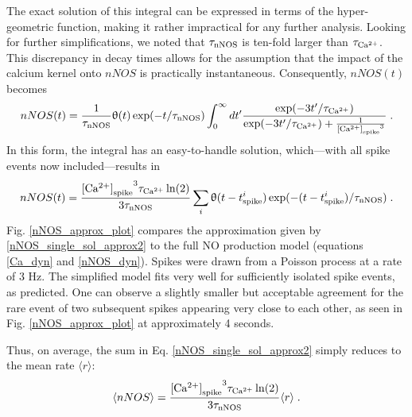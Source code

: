 \documentclass[10pt,letterpaper]{article}
\begin{document}
The exact solution of this integral can be expressed in terms of the hyper-geometric function, making it rather impractical for any further analysis. Looking for further simplifications, we noted that $\tau_{\rm nNOS}$ is ten-fold larger than $\tau_{\rm Ca^{2+}}$. This discrepancy in decay times allows for the assumption that the impact of the calcium kernel onto $nNOS$ is practically instantaneous. Consequently, $nNOS(t)$ becomes
\begin{equation}
nNOS(t) = \frac{1}{\tau_{\rm nNOS}} \uptheta(t) \exp(-t/\tau_{\rm nNOS}) \int_{0}^\infty dt' \frac{\exp(-3t'/\tau_{\rm Ca^{2+}})}{\exp(-3t'/\tau_{\rm Ca^{2+}}) + \frac{1}{{{\rm [Ca^{2+}]}_{\rm spike}}^3}}\;.
\label{nNOS_single_sol_approx1}
\end{equation}
In this form, the integral has an easy-to-handle solution, which---with all spike events now included---results in
\begin{equation}
nNOS(t) = \frac{{{\rm [Ca^{2+}]}_{\rm spike}}^3 \tau_{\rm Ca^{2+}}\ln(2)}{3\tau_{\rm nNOS}} \sum_i \uptheta(t-t^i_{\rm spike}) \exp(-(t-t^i_{\rm spike})/\tau_{\rm nNOS})\;.
\label{nNOS_single_sol_approx2}
\end{equation}
Fig. \ref{nNOS_approx_plot} compares the approximation given by \eqref{nNOS_single_sol_approx2} to the full NO production model (equations \eqref{Ca_dyn} and \eqref{nNOS_dyn}). Spikes were drawn from a Poisson process at a rate of 3 Hz. The simplified model fits very well for sufficiently isolated spike events, as predicted. One can observe a slightly smaller but acceptable agreement for the rare event of two subsequent spikes appearing very close to each other, as seen in Fig. \ref{nNOS_approx_plot} at approximately 4 seconds.

Thus, on average, the sum in Eq. \eqref{nNOS_single_sol_approx2} simply reduces to the mean rate $\langle r \rangle$:
\begin{equation}
\langle nNOS \rangle = \frac{{{\rm [Ca^{2+}]}_{\rm spike}}^3 \tau_{\rm Ca^{2+}}\ln(2)}{3\tau_{\rm nNOS}} \langle r \rangle \; .
\label{nNOS_single_sol_approx3}
\end{equation}
\end{document}

